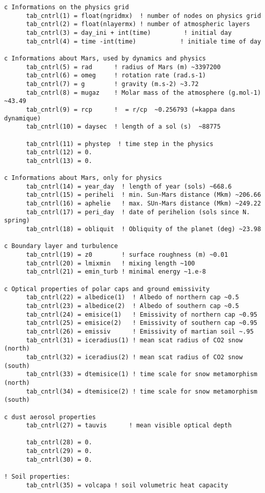 {\footnotesize
\begin{verbatim}
c Informations on the physics grid
      tab_cntrl(1) = float(ngridmx)  ! number of nodes on physics grid
      tab_cntrl(2) = float(nlayermx) ! number of atmospheric layers
      tab_cntrl(3) = day_ini + int(time)         ! initial day 
      tab_cntrl(4) = time -int(time)            ! initiale time of day

c Informations about Mars, used by dynamics and physics
      tab_cntrl(5) = rad      ! radius of Mars (m) ~3397200
      tab_cntrl(6) = omeg     ! rotation rate (rad.s-1)
      tab_cntrl(7) = g        ! gravity (m.s-2) ~3.72
      tab_cntrl(8) = mugaz    ! Molar mass of the atmosphere (g.mol-1) ~43.49
      tab_cntrl(9) = rcp      !  = r/cp  ~0.256793 (=kappa dans dynamique)
      tab_cntrl(10) = daysec  ! length of a sol (s)  ~88775

      tab_cntrl(11) = phystep  ! time step in the physics
      tab_cntrl(12) = 0.
      tab_cntrl(13) = 0.

c Informations about Mars, only for physics
      tab_cntrl(14) = year_day  ! length of year (sols) ~668.6
      tab_cntrl(15) = periheli  ! min. Sun-Mars distance (Mkm) ~206.66
      tab_cntrl(16) = aphelie   ! max. SUn-Mars distance (Mkm) ~249.22
      tab_cntrl(17) = peri_day  ! date of perihelion (sols since N. spring)
      tab_cntrl(18) = obliquit  ! Obliquity of the planet (deg) ~23.98

c Boundary layer and turbulence
      tab_cntrl(19) = z0        ! surface roughness (m) ~0.01
      tab_cntrl(20) = lmixmin   ! mixing length ~100
      tab_cntrl(21) = emin_turb ! minimal energy ~1.e-8

c Optical properties of polar caps and ground emissivity
      tab_cntrl(22) = albedice(1)  ! Albedo of northern cap ~0.5
      tab_cntrl(23) = albedice(2)  ! Albedo of southern cap ~0.5
      tab_cntrl(24) = emisice(1)   ! Emissivity of northern cap ~0.95
      tab_cntrl(25) = emisice(2)   ! Emissivity of southern cap ~0.95
      tab_cntrl(26) = emissiv      ! Emissivity of martian soil ~.95
      tab_cntrl(31) = iceradius(1) ! mean scat radius of CO2 snow (north)
      tab_cntrl(32) = iceradius(2) ! mean scat radius of CO2 snow (south)
      tab_cntrl(33) = dtemisice(1) ! time scale for snow metamorphism (north)
      tab_cntrl(34) = dtemisice(2) ! time scale for snow metamorphism (south)

c dust aerosol properties
      tab_cntrl(27) = tauvis      ! mean visible optical depth

      tab_cntrl(28) = 0. 
      tab_cntrl(29) = 0.
      tab_cntrl(30) = 0.

! Soil properties:
      tab_cntrl(35) = volcapa ! soil volumetric heat capacity
\end{verbatim}
}
